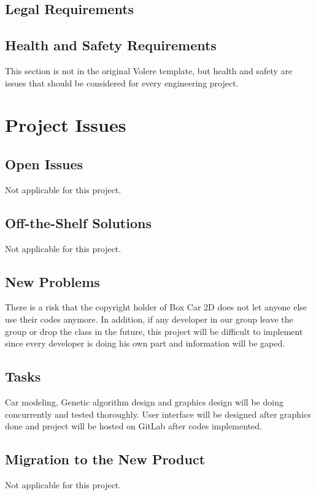 \documentclass[12pt, titlepage]{article}
\begin{document}
\subsection{Legal Requirements}

\subsection{Health and Safety Requirements}

This section is not in the original Volere template, but health and safety are
issues that should be considered for every engineering project.

\section{Project Issues}

\subsection{Open Issues}
Not applicable for this project.

\subsection{Off-the-Shelf Solutions}
Not applicable for this project.

\subsection{New Problems}
There is a risk that the copyright holder of Box Car 2D does not let anyone
 else use their codes anymore. In addition, if any developer in our group 
leave the group or drop the class in the future, this project will be 
difficult to implement since every developer is doing his own part and
 information will be gaped.

\subsection{Tasks}
Car modeling, Genetic algorithm design and graphics design will be doing 
concurrently and tested thoroughly. User interface will be designed after 
graphics done and project will be hosted on GitLab after codes implemented.

\subsection{Migration to the New Product}
Not applicable for this project.
\end{document}
